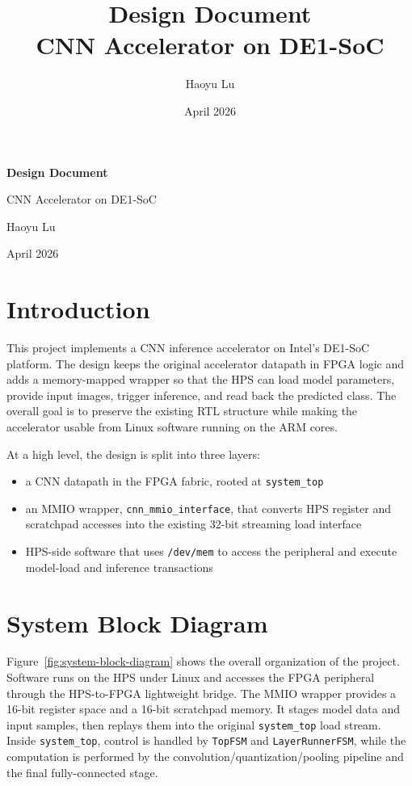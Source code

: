 \documentclass[11pt]{article}
\title{\textbf{Design Document}\\[0.5em]\large CNN Accelerator on DE1-SoC}
\author{Haoyu Lu}
\date{April 2026}
\begin{document}
\begin{titlepage}
\centering
\vspace*{3cm}
{\LARGE \textbf{Design Document}\par}
\vspace{0.8cm}
{\Large CNN Accelerator on DE1-SoC\par}
\vspace{2cm}
{\large Haoyu Lu\par}
\vspace{0.5cm}
{\large April 2026\par}
\vfill
\end{titlepage}

\tableofcontents
\newpage

\section{Introduction}

This project implements a CNN inference accelerator on Intel's DE1-SoC
platform. The design keeps the original accelerator datapath in FPGA logic and
adds a memory-mapped wrapper so that the HPS can load model parameters, provide
input images, trigger inference, and read back the predicted class. The overall
goal is to preserve the existing RTL structure while making the accelerator
usable from Linux software running on the ARM cores.

At a high level, the design is split into three layers:
\begin{itemize}
\item a CNN datapath in the FPGA fabric, rooted at \texttt{system\_top}
\item an MMIO wrapper, \texttt{cnn\_mmio\_interface}, that converts HPS register
and scratchpad accesses into the existing 32-bit streaming load interface
\item HPS-side software that uses \texttt{/dev/mem} to access the peripheral and
execute model-load and inference transactions
\end{itemize}

\section{System Block Diagram}

Figure~\ref{fig:system-block-diagram} shows the overall organization of the
project. Software runs on the HPS under Linux and accesses the FPGA peripheral
through the HPS-to-FPGA lightweight bridge. The MMIO wrapper provides a 16-bit
register space and a 16-bit scratchpad memory. It stages model data and input
samples, then replays them into the original \texttt{system\_top} load stream.
Inside \texttt{system\_top}, control is handled by \texttt{TopFSM} and
\texttt{LayerRunnerFSM}, while the computation is performed by the
convolution/quantization/pooling pipeline and the final fully-connected stage.
\end{document}
